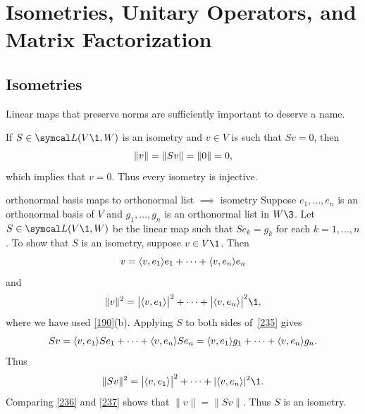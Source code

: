 \section{Isometries, Unitary Operators, and Matrix Factorization} \label{3QR}

\subsection{Isometries}

Linear maps that preserve norms are sufficiently important to deserve a name.



If $S \in \L(V\1, W)$ is an isometry and \mbox{$v \in V$} is such that $Sv = 0$, then
\[
\lVert v\rVert = \lVert Sv\rVert = \lVert0\rVert = 0,
\]
which implies that $v = 0$. Thus every isometry is injective.

\begin{example}[isoex]{orthonormal basis maps to orthonormal list\/ $\implies$ isometry}
Suppose $e_1, \ldots, e_n$ is an orthonormal basis of $V$ and $g_1, \ldots, g_n$ is an orthonormal list in $W\3$. Let $S \in \L(V\1,W)$ be the linear map such that $Se_k = g_k$ for each $k= 1, \ldots, n$. To show that $S$ is an isometry, suppose $v \in V\1$.  Then
\begin{equation} \label{235}
v = \langle v, e_1\rangle e_1 + \dots + \langle v, e_n\rangle e_n
\end{equation}%
and
\begin{equation} \label{236}
\|v\|^2 = \abs[\big]{\ip{v, e_1}}^2 + \dots + \abs[\big]{\ip{v, e_n}}^2\1,
\end{equation}%
where we have used \ref{190}(b).
Applying $S$ to both sides of~\ref{235} gives
\[
Sv = \langle v, e_1\rangle S e_1 + \dots + \langle v, e_n\rangle S e_n
=  \langle v, e_1\rangle g_1 + \dots +  \langle v, e_n\rangle g_n.
\]
Thus
\begin{equation} \label{237}
\|Sv\|^2 = \abs[\big]{\ip{v, e_1}}^2 + \dots + \abs{\ip{v, e_n}}^2\1.
\end{equation}%
Comparing \ref{236} and \ref{237} shows that $\|v\| = \|Sv\|$.  Thus $S$ is an isometry.
\end{example}

